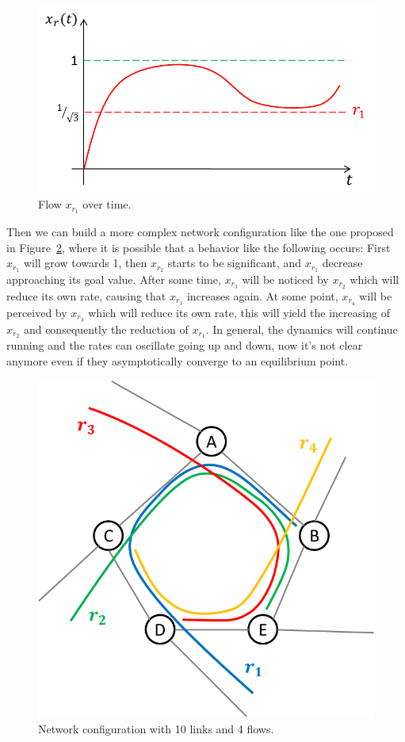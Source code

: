 \begin{figure}[h!]
\centering
\includegraphics[scale=.7]{r1In3Routes}
\caption{Flow $x_{r_1}$ over time.}
\label{figur7}
\end{figure}

Then we can build a more complex network configuration like the one proposed in Figure~\ref{figur8}, where it is possible that a behavior like the following occurs: 
First $x_{r_1}$ will grow towards 1, then $x_{r_2}$ starts to be significant, and $x_{r_1}$ decrease approaching its goal value. After some time, $x_{r_3}$ will be noticed by $x_{r_2}$ which will reduce its own rate, causing that $x_{r_1}$ increases again. At some point, $x_{r_4}$ will be perceived by $x_{r_3}$ which will reduce its own rate, this will yield the increasing of $x_{r_2}$ and consequently the reduction of $x_{r_1}$. In general, the dynamics will continue running and the rates can oscillate going up and down, now it's not clear anymore even if they asymptotically converge to an equilibrium point.

\begin{figure}[h!]
\centering
\includegraphics[scale=.7]{complexNetwork}
\caption{Network configuration with 10 links and 4 flows.}
\label{figur8}
\end{figure}

